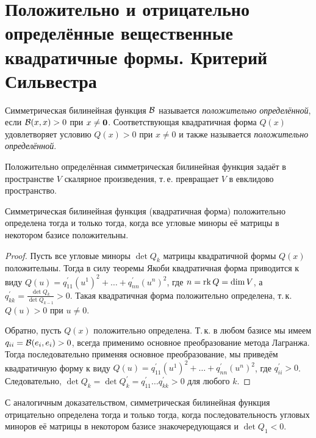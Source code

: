 \section{Положительно и отрицательно определённые вещественные квадратичные формы. Критерий Сильвестра}

\begin{definition}
    Симметрическая билинейная функция $\mathcal{B}$ называется \textit{положительно определённой}, если $\mathcal{B}(x, x) > 0$ при $x \ne \boldsymbol{0}$. Соответствующая квадратичная форма $Q(x)$ удовлетворяет условию $Q(x) > 0$ при $x \ne 0$ и также называется \textit{положительно определённой}.
\end{definition}

Положительно определённая симметрическая билинейная функция задаёт в пространстве $V$ скалярное произведения, т.\,е. превращает $V$ в евклидово пространство.

\begin{theorem}
    Симметрическая билинейная функция (квадратичная форма) положительно определена тогда и только тогда, когда все угловые миноры её матрицы в некотором базисе положительны.
\end{theorem}

\begin{proof}
    Пусть все угловые миноры $\det Q_k$ матрицы квадратичной формы $Q(x)$ положительны. Тогда в силу теоремы Якоби квадратичная форма приводится к виду $Q(u) = q^\prime_{11}(u^1)^2 + \ldots + q^\prime_{nn}(u^n)^2$, где $n = \operatorname{rk} Q = \dim V$, а $q^\prime_{kk} = \frac{\det Q_k}{\det Q_{k - 1}} > 0$. Такая квадратичная форма положительно определена, т.\,к. $Q(u) > 0$ при $u \ne 0$.

    Обратно, пусть $Q(x)$ положительно определена. Т.\,к. в любом базисе мы имеем $q_{ii} = \mathcal{B}(e_i, e_i) > 0$, всегда применимо основное преобразование метода Лагранжа. Тогда последовательно применяя основное преобразование, мы приведём квадратичную форму к виду $Q(u) = q^\prime_{11}(u^1)^2 + \ldots + q^\prime_{nn}(u^n)^2$, где $q^\prime_{ii} > 0$. Следовательно, $\det Q_k = \det Q^\prime_k = q^\prime_{11}\ldots q^\prime_{kk} > 0$ для любого $k$.
\end{proof}

\begin{remark}
    С аналогичным доказательством, симметрическая билинейная функция отрицательно определена тогда и только тогда, когда последовательность угловых миноров её матрицы в некотором базисе знакочередующаяся и $\det Q_1 < 0$.
\end{remark}

